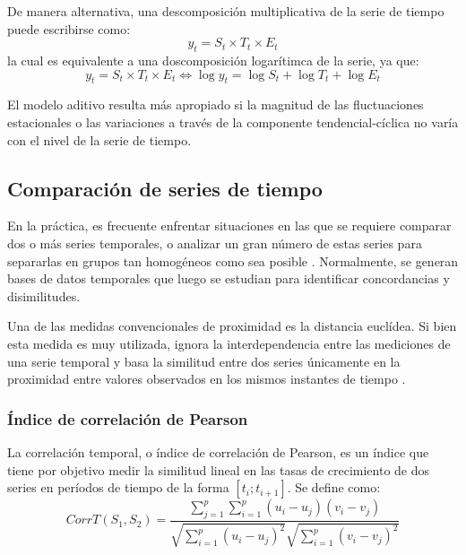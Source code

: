      De manera alternativa, una descomposición multiplicativa de la serie de tiempo puede escribirse como:
     \begin{equation}
        y_t = S_t 
        \times T_t 
        \times E_t
     \end{equation}
     la cual es equivalente a una doscomposición logarítimca de la serie, ya que:
     \begin{equation*}
        y_t = S_t 
        \times T_t 
        \times E_t
        \iff
        \log y_t =  \log S_t +
        \log T_t +
        \log E_t
     \end{equation*}

     El modelo aditivo resulta más apropiado si la magnitud de las fluctuaciones estacionales o las variaciones
     a través de la componente tendencial-cíclica no varía con el nivel de la serie de tiempo.


     \subsection{Comparación de series de tiempo}
     En la práctica, es frecuente enfrentar situaciones
     en las que se requiere comparar dos o más series temporales, o analizar un gran
     número de estas series para separarlas en grupos tan homogéneos como sea posible \cite{27}.
     Normalmente, se generan bases de datos temporales que luego se estudian para identificar concordancias y disimilitudes.    

     Una de las medidas convencionales de proximidad es la distancia euclídea. Si bien esta medida es muy utilizada, ignora la interdependencia entre
     las mediciones de una serie temporal y basa la similitud entre dos series únicamente en la proximidad entre valores observados en los mismos instantes de
     tiempo \cite{27}.
     \subsubsection{Índice de correlación de Pearson}
     La correlación temporal, o índice de correlación de Pearson, es un índice que tiene por objetivo medir la similitud lineal en las tasas de crecimiento de dos series en períodos de
     tiempo de la forma $[t_i; t_{i+1}]$. Se define como:
     \begin{equation}\label{eqn:cort}
        CorrT(S_1,S_2) = \frac{\sum_{j=1}^p\sum_{i=1}^p(u_i-u_j)(v_i-v_j)} {\sqrt{\sum_{i=1}^p(u_i-u_j)^2}\sqrt{\sum_{i=1}^p(v_i-v_j)^2}}
     \end{equation}

